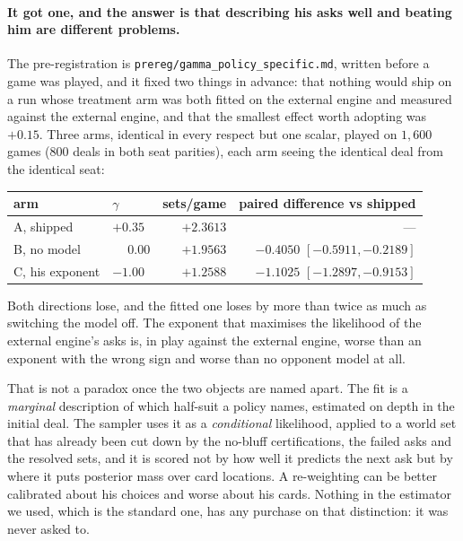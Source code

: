\documentclass[11pt,letterpaper]{article}
\begin{document}
\paragraph{It got one, and the answer is that describing his asks well and
beating him are different problems.} The pre-registration is
\texttt{prereg/gamma\_policy\_specific.md}, written before a game was played,
and it fixed two things in advance: that nothing would ship on a run whose
treatment arm was both fitted on the external engine and measured against the external engine, and that the
smallest effect worth adopting was $+0.15$. Three arms, identical in every
respect but one scalar, played on $1{,}600$ games ($800$ deals in both seat
parities), each arm seeing the identical deal from the identical seat:

\begin{center}
\small
\begin{tabular}{llrr}
\toprule
arm & $\gamma$ & sets/game & paired difference vs shipped \\
\midrule
A, shipped        & $+0.35$ & $+2.3613$ & --- \\
B, no model       & $\phantom{+}0.00$ & $+1.9563$ & $-0.4050$ $[-0.5911, -0.2189]$ \\
C, his exponent   & $-1.00$ & $+1.2588$ & $-1.1025$ $[-1.2897, -0.9153]$ \\
\bottomrule
\end{tabular}
\end{center}

\noindent Both directions lose, and the fitted one loses by more than twice as
much as switching the model off. The exponent that maximises the likelihood of
the external engine's asks is, in play against the external engine, worse than an exponent with the wrong
sign and worse than no opponent model at all.

That is not a paradox once the two objects are named apart. The fit is a
\emph{marginal} description of which half-suit a policy names, estimated on
depth in the initial deal. The sampler uses it as a \emph{conditional}
likelihood, applied to a world set that has already been cut down by the
no-bluff certifications, the failed asks and the resolved sets, and it is
scored not by how well it predicts the next ask but by where it puts posterior
mass over card locations. A re-weighting can be better calibrated about his
choices and worse about his cards. Nothing in the estimator we used, which is
the standard one, has any purchase on that distinction: it was never asked to.
\end{document}
